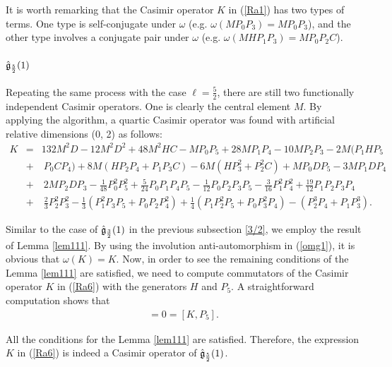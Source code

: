 \documentclass[12pt]{article}
\begin{document}
It is worth remarking that the Casimir operator $K$ in (\ref{Ra1}) has two
types of terms. One type is self-conjugate under $\omega$ (e.g.
$\omega(M P_0 P_3)=M P_0 P_3$), and the other type involves a conjugate pair under
$\omega$ (e.g. $\omega(M H P_1 P_3) = M P_0 P_2 C$).
 
 
 
 \subsubsection{$\mathfrak{\Hat{g}}_\frac{5}{2}(1)$}\label{5/2}

 Repeating the same process with the case $\ell=\frac{5}{2} $, there are still
 two functionally independent Casimir operators. One is clearly the central
 element $M$.  By applying the algorithm, a quartic Casimir operator was found with artificial relative dimensions (0, 2) as follows:
\begin{eqnarray}
K&=& 132 M^2 D -12  M^2 D^{2} +48  M^2 H C - MP_{0}P_{5}
+ 28 MP_{1}P_{4} -10 MP_{2}P_{3} -2 M ( P_{1}HP_{5}
 \nonumber \\
&+&\ P_{0}C P_{4}) + 8 M ( H P_{2}P_{4}+  P_{1}P_{3}C )-6 M (H P^{2}_{3} + P^{2}_{2}C) + M  P_{0}DP_{5} -3 M  P_{1}DP_{4}
\nonumber \\
&+&\  2 M  P_{2}DP_{3} - \frac{1}{48}P^{2}_{0}P^{2}_{5}+ \frac{5}{24}P_{0}P_{1}
P_{4}P_{5}-\frac{1}{12} P_{0}P_{2}P_{3}P_{5}-\frac{3}{16}P^{2}_{1}P^{2}_{4}+  \frac{19}{12}P_{1}P_{2}P_{3}P_{4} 
\nonumber \\
&+&\ \frac{2}{3} P^{2}_{2} P^{2}_{3} -\frac{1}{3} (P^{2}_{1} P_{3}P_{5}+ P_{0}P_{2} P^{2}_{4})+ \frac{1}{4}(P_{1} P^{2}_{2} P_{5}+ P_{0} P^{2}_{3}P_{4})- (   P^{3}_{2} P_{4}+  P_{1} P^{3}_{3}).  \label{Ra6}  
\end{eqnarray} 

Similar to the case of $\mathfrak{\Hat{g}}_\frac{3}{2}(1)$ in the previous
subsection \ref{3/2}, we employ the result of Lemma \ref{lem111}. By using the
involution anti-automorphism in (\ref{omg1}), it is obvious that $\omega(K)=K$.
Now, in order to see the remaining conditions of the Lemma \ref{lem111} are
satisfied,  we need to compute commutators of the Casimir operator $K$  in (\ref{Ra6}) with the
generators $H$  and  $P_ {5}$. A straightforward computation shows that
\begin{eqnarray*}
[K, H]=0=[K,P_ {5}].
\end{eqnarray*}

All the conditions for the Lemma \ref{lem111} are satisfied. Therefore, the
expression $K$ in (\ref{Ra6}) is indeed a Casimir operator of
$\mathfrak{\Hat{g}}_\frac{5}{2}(1)$. 
\end{document}
